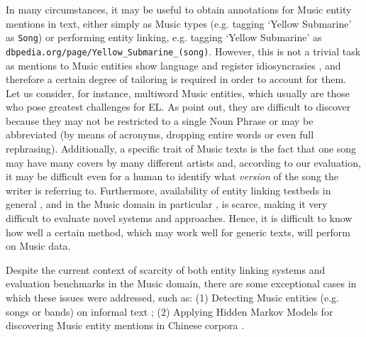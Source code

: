 In many circumstances, it may be useful to obtain annotations for Music entity mentions in text, either simply as Music types (e.g. tagging `Yellow Submarine' as \texttt{Song}) or performing entity linking, e.g. tagging `Yellow Submarine' as \texttt{dbpedia.org/page/Yellow\_Submarine\_(song)}. However, this is not a trivial task as mentions to Music entities show language and register idiosyncrasies \citep{TataandDiEugenio2010,Gruhl2009}, and therefore a certain degree of tailoring is required in order to account for them. Let us consider, for instance, multiword Music entities, which usually are those who pose greatest challenges for EL. As \cite{TataandDiEugenio2010} point out, they are difficult to discover because they may not be restricted to a single Noun Phrase or may be abbreviated (by means of acronyms, dropping entire words or even full rephrasing). Additionally, a specific trait of Music texts is the fact that one song may have many covers by many different artists and, according to our evaluation, it may be difficult even for a human to identify what \textit{version} of the song the writer is referring to. Furthermore, availability of entity linking testbeds in general \citep{Usbeck2015}, and in the Music domain in particular \citep{Gruhl2009}, is scarce, making it very difficult to evaluate novel systems and approaches. Hence, it is difficult to know how well a certain method, which may work well for generic texts, will perform on Music data.


Despite the current context of scarcity of both entity linking systems and evaluation benchmarks in the Music domain, there are some exceptional cases in which these issues were addressed, such as: (1) Detecting Music entities (e.g. songs or bands) on informal text \citep{Gruhl2009}; (2) Applying Hidden Markov Models for discovering Music entity mentions in Chinese corpora \citep{Zhang2009}.%

